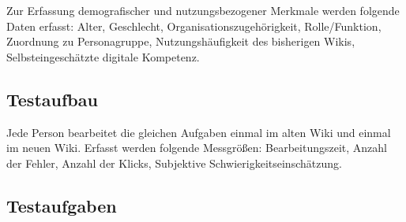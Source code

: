 Zur Erfassung demografischer und nutzungsbezogener Merkmale werden folgende Daten erfasst: Alter, Geschlecht, Organisationszugehörigkeit, Rolle/Funktion, Zuordnung zu Personagruppe, Nutzungshäufigkeit des bisherigen Wikis, Selbsteingeschätzte digitale Kompetenz.


\subsection{Testaufbau}

Jede Person bearbeitet die gleichen Aufgaben einmal im alten Wiki und einmal im neuen Wiki.
Erfasst werden folgende Messgrößen: Bearbeitungszeit, Anzahl der Fehler, Anzahl der Klicks, Subjektive Schwierigkeitseinschätzung.


\subsection{Testaufgaben}

